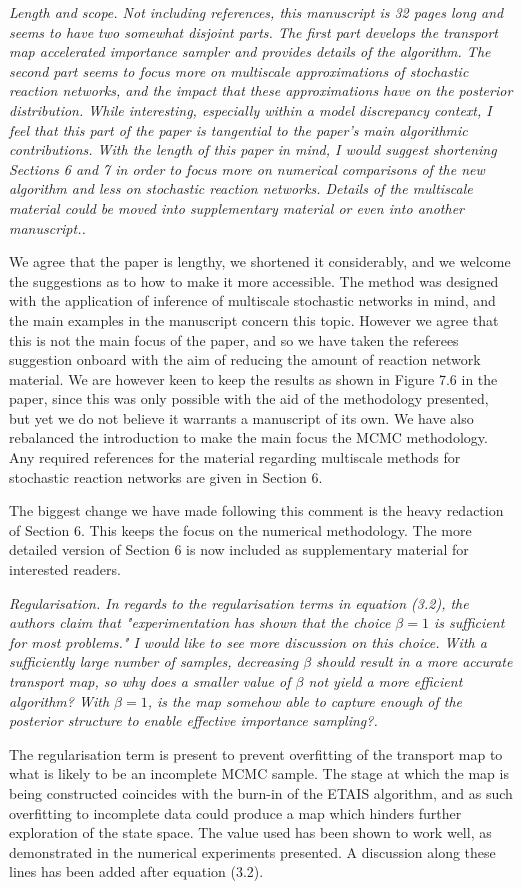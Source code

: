 \documentclass{article}
\newcommand{\comment}[2]{\vspace{0.6cm}{\bf Comment:} {\it #1.}

\vspace{0.3cm}{\bf Answer:} #2}
\begin{document}
\comment{Length and scope. Not including references, this manuscript is 32 pages long and seems to have two somewhat disjoint parts. The first part develops the transport map accelerated importance sampler and provides details of the algorithm. The second part seems to focus more on multiscale approximations of stochastic reaction networks, and the impact that these approximations have on the posterior distribution. While interesting, especially within a model discrepancy context, I feel that this part of the paper is tangential to the paper's main algorithmic contributions. With the length of this paper in mind, I would suggest shortening Sections 6 and 7 in order to focus more on numerical comparisons of the new algorithm and less on stochastic reaction networks. Details of the multiscale material could be moved into supplementary material or even into another manuscript.}{We agree that the paper is lengthy, we shortened it considerably, and we welcome the suggestions as to how to make it more accessible. The method was designed with the application of inference of multiscale stochastic networks in mind, and the main examples in the manuscript concern this topic. However we agree that this is not the main focus of the paper, and so we have taken the referees suggestion onboard with the aim of reducing the amount of reaction network material. We are however keen to keep the results as shown in Figure 7.6 in the paper, since this was only possible with the aid of the methodology presented, but yet we do not believe it warrants a manuscript of its own. We have also rebalanced the introduction to make the main focus the MCMC methodology. Any required references for the material regarding multiscale methods for stochastic reaction networks are given in Section 6.

  The biggest change we have made following this comment is the heavy redaction of Section 6. This keeps the focus on the numerical methodology. The more detailed version of Section 6 is now included as supplementary material for interested readers.}


\comment{Regularisation. In regards to the regularisation terms in equation (3.2), the authors claim that "experimentation has shown that the choice $\beta=1$ is sufficient for most problems." I would like to see more discussion on this choice. With a sufficiently large number of samples, decreasing $\beta$ should result in a more accurate transport map, so why does a smaller value of $\beta$ not yield a more efficient algorithm? With $\beta=1$, is the map somehow able to capture enough of the posterior structure to enable effective importance sampling?}{The regularisation term is present to prevent overfitting of the transport map to what is likely to be an incomplete MCMC sample. The stage at which the map is being constructed coincides with the burn-in of the ETAIS algorithm, and as such overfitting to incomplete data could produce a map which hinders further exploration of the state space. The value used has been shown to work well, as demonstrated in the numerical experiments presented. A discussion along these lines has been added after equation (3.2).}
\end{document}
